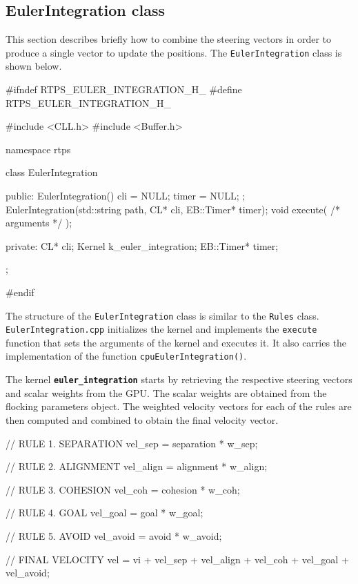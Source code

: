 


\subsection{EulerIntegration class} \label{eulerclass}
This section describes briefly how to combine the steering vectors in order to produce a single vector to update the positions. The \texttt{EulerIntegration} class is shown below.

\begin{cppcode}{0}
#ifndef RTPS_EULER_INTEGRATION_H_
#define RTPS_EULER_INTEGRATION_H_

#include <CLL.h>
#include <Buffer.h>

namespace rtps
{
	class EulerIntegration
	{
		public:
			EulerIntegration() { cli = NULL; timer = NULL; };
	 		EulerIntegration(std::string path, CL* cli, EB::Timer* timer);
			void execute( /* arguments */ );

		private:
			CL* cli;
			Kernel k_euler_integration;
			EB::Timer* timer;
	};
}
#endif
\end{cppcode}
\vspace{16pt}

The structure of the \texttt{EulerIntegration} class is similar to the \texttt{Rules} class. \texttt{EulerIntegration.cpp} initializes the kernel and implements the \texttt{execute} function that sets the arguments of the kernel and executes it. It also carries the implementation of the function \texttt{cpuEulerIntegration()}. 

The kernel \texttt{\textbf{euler\_integration}} starts by retrieving the respective steering vectors and scalar weights from the GPU. The scalar weights are obtained from the flocking parameters object. The weighted velocity vectors for each of the rules are then computed and combined to obtain the final velocity vector.

\begin{cppcode}{0}
// RULE 1. SEPARATION
vel_sep = separation * w_sep;
   
// RULE 2. ALIGNMENT
vel_align = alignment * w_align;

// RULE 3. COHESION
vel_coh = cohesion * w_coh;

// RULE 4. GOAL
vel_goal = goal * w_goal;

// RULE 5. AVOID
vel_avoid = avoid * w_avoid;

// FINAL VELOCITY
vel = vi + vel_sep + vel_align + vel_coh + vel_goal + vel_avoid;
\end{cppcode}
\vspace{16pt}

